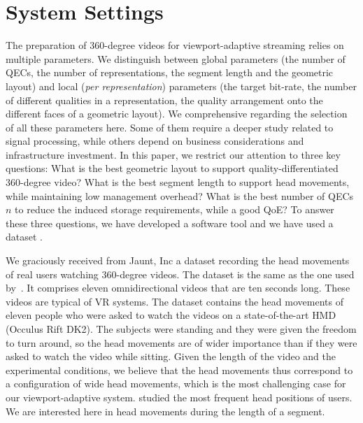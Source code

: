 \newcommand\testbitrateBudget{6}
\newcommand\testbitrateBudgetPercentage{\SI{75}{\percent}}
\section{System Settings}
\label{sec:settings}

The preparation of 360-degree videos for viewport-adaptive streaming
relies on multiple parameters. We distinguish between global
parameters (the number of \acp{QEC}, the number of
representations, the segment length and the geometric layout)
and local (\emph{per representation}) parameters (the target bit-rate,
the number of different qualities in a representation, the quality
arrangement onto the different faces of a geometric layout). We  comprehensive regarding the selection of all these
parameters here. Some of them require a deeper study related to signal
processing, while others depend on business
considerations and infrastructure investment. In this paper, we
restrict our attention to three key questions: What is the best
geometric layout to support quality-differentiated 360-degree video?
What is the best segment length to support head movements, while
maintaining low management overhead? What is the best number of
\acp{QEC} $n$ to reduce the induced storage requirements, while
 a good \ac{QoE}? To answer these three questions, we have
developed a software tool and we have used a dataset .


We graciously received from Jaunt, Inc a dataset
recording the head movements of real users watching 360-degree videos.
The dataset is the same as the one used by~\citet{yu_framework_2015}. It comprises
eleven omnidirectional videos that are ten seconds long. These videos
are typical of \ac{VR} systems. The dataset contains
the head movements of eleven people who were asked to watch the videos
on a state-of-the-art \ac{HMD} (Occulus Rift DK2). The subjects were
standing and they were given the freedom to turn around, so the head
movements are of wider importance than if they were asked to watch the
video while sitting. Given the length of the video and the
experimental conditions, we believe that the head movements thus
correspond to a configuration of wide head movements, which
is the most challenging case for our viewport-adaptive
system. \citet{yu_framework_2015} studied the most frequent head
positions of users. We are interested here in head movements
during the length of a segment.

